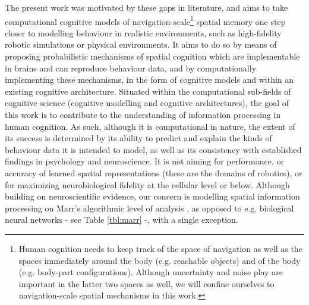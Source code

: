 The present work was motivated by these gaps in literature, and aims to take computational cognitive models of navigation-scale\footnote{Human cognition needs to keep track of the space of navigation as well as the spaces immediately around the body (e.g. reachable objects) and of the body (e.g. body-part configurations). Although uncertainty and noise play are important in the latter two spaces as well, we will confine ourselves to navigation-scale spatial mechanisms in this work.} spatial memory one step closer to modelling behaviour in realistic environments, such as high-fidelity robotic simulations or physical environments. It aims to do so by means of proposing probabilistic mechanisms of spatial cognition which are implementable in brains and can reproduce behaviour data, and by computationally implementing these mechanisms, in the form of cognitive models and within an existing cognitive architecture. Situated within the computational sub-fields of cognitive science (cognitive modelling and cognitive architectures), the goal of this work is to contribute to the understanding of information processing in human cognition. As such, although it is computational in nature, the extent of its success is determined by its ability to predict and explain the kinds of behaviour data it is intended to model, as well as its consistency with established findings in psychology and neuroscience. It is not aiming for performance, or accuracy of learned spatial representations (these are the domains of robotics), or for maximizing neurobiological fidelity at the cellular level or below. Although building on neuroscientific evidence, our concern is modelling spatial information processing on Marr's algorithmic level of analysis \citep{marr1976understanding, marr1977understanding}, as opposed to e.g. biological neural networks - see Table \ref{tbl:marr} -, with a single exception. 


